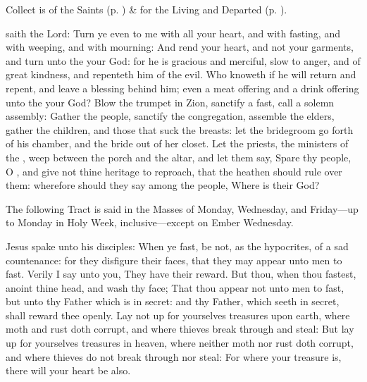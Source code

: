 \begin{rubric}
     Collect is of the Saints (p. \pageref{SPSaints}) \&  for the Living and Departed (p. \pageref{SPLivingDeparted}).
\end{rubric}
 saith the Lord: Turn ye even to me with all your heart, and with fasting, and with weeping, and with mourning: And rend your heart, and not your garments, and turn unto the  your God: for he is gracious and merciful, slow to anger, and of great kindness, and repenteth him of the evil. Who knoweth if he will return and repent, and leave a blessing behind him; even a meat offering and a drink offering unto the  your God? Blow the trumpet in Zion, sanctify a fast, call a solemn assembly: Gather the people, sanctify the congregation, assemble the elders, gather the children, and those that suck the breasts: let the bridegroom go forth of his chamber, and the bride out of her closet. Let the priests, the ministers of the , weep between the porch and the altar, and let them say, Spare thy people, O , and give not thine heritage to reproach, that the heathen should rule over them: wherefore should they say among the people, Where is their God?
\begin{rubric}
    The following Tract is said in the Masses of Monday, Wednesday, and Friday---up to Monday in Holy Week, inclusive---except on Ember Wednesday.
\end{rubric}
 Jesus spake unto his disciples: When ye fast, be not, as the hypocrites, of a sad countenance: for they disfigure their faces, that they may appear unto men to fast. Verily I say unto you, They have their reward. But thou, when thou fastest, anoint thine head, and wash thy face; That thou appear not unto men to fast, but unto thy Father which is in secret: and thy Father, which seeth in secret, shall reward thee openly. Lay not up for yourselves treasures upon earth, where moth and rust doth corrupt, and where thieves break through and steal: But lay up for yourselves treasures in heaven, where neither moth nor rust doth corrupt, and where thieves do not break through nor steal: For where your treasure is, there will your heart be also.
